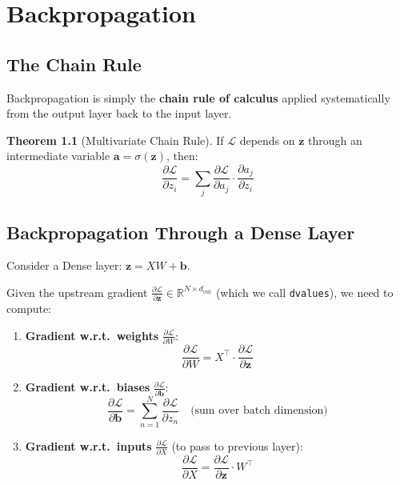 \documentclass[12pt, a4paper]{report}
\theoremstyle{definition}
\newtheorem{theorem}{Theorem}[chapter]
\begin{document}
\chapter{Backpropagation}

\section{The Chain Rule}

Backpropagation is simply the \textbf{chain rule of calculus} applied systematically from the output layer back to the input layer.

\begin{theorem}[Multivariate Chain Rule]
If $\mathcal{L}$ depends on $\mathbf{z}$ through an intermediate variable $\mathbf{a} = \sigma(\mathbf{z})$, then:
\begin{equation}
    \frac{\partial \mathcal{L}}{\partial z_i} = \sum_j \frac{\partial \mathcal{L}}{\partial a_j} \cdot \frac{\partial a_j}{\partial z_i}
\end{equation}
\end{theorem}

\section{Backpropagation Through a Dense Layer}

Consider a Dense layer: $\mathbf{z} = X W + \mathbf{b}$.

Given the upstream gradient $\frac{\partial \mathcal{L}}{\partial \mathbf{z}} \in \mathbb{R}^{N \times d_\text{out}}$ (which we call \texttt{dvalues}), we need to compute:

\begin{enumerate}[label=\textbf{\arabic*.}]
    \item \textbf{Gradient w.r.t.\ weights} $\frac{\partial \mathcal{L}}{\partial W}$:
    \begin{equation}
        \frac{\partial \mathcal{L}}{\partial W} = X^\top \cdot \frac{\partial \mathcal{L}}{\partial \mathbf{z}}
    \end{equation}
    
    \item \textbf{Gradient w.r.t.\ biases} $\frac{\partial \mathcal{L}}{\partial \mathbf{b}}$:
    \begin{equation}
        \frac{\partial \mathcal{L}}{\partial \mathbf{b}} = \sum_{n=1}^{N} \frac{\partial \mathcal{L}}{\partial z_n} \quad \text{(sum over batch dimension)}
    \end{equation}
    
    \item \textbf{Gradient w.r.t.\ inputs} $\frac{\partial \mathcal{L}}{\partial X}$ (to pass to previous layer):
    \begin{equation}
        \frac{\partial \mathcal{L}}{\partial X} = \frac{\partial \mathcal{L}}{\partial \mathbf{z}} \cdot W^\top
    \end{equation}
\end{enumerate}
\end{document}
